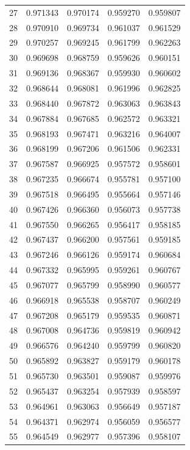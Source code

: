 \begin{table}
\begin{tabular}{rrrrr}
27 & 0.971343 & 0.970174 & 0.959270 & 0.959807 \\
28 & 0.970910 & 0.969734 & 0.961037 & 0.961529 \\
29 & 0.970257 & 0.969245 & 0.961799 & 0.962263 \\
30 & 0.969698 & 0.968759 & 0.959626 & 0.960151 \\
31 & 0.969136 & 0.968367 & 0.959930 & 0.960602 \\
32 & 0.968644 & 0.968081 & 0.961996 & 0.962825 \\
33 & 0.968440 & 0.967872 & 0.963063 & 0.963843 \\
34 & 0.967884 & 0.967685 & 0.962572 & 0.963321 \\
35 & 0.968193 & 0.967471 & 0.963216 & 0.964007 \\
36 & 0.968199 & 0.967206 & 0.961506 & 0.962331 \\
37 & 0.967587 & 0.966925 & 0.957572 & 0.958601 \\
38 & 0.967235 & 0.966674 & 0.955781 & 0.957100 \\
39 & 0.967518 & 0.966495 & 0.955664 & 0.957146 \\
40 & 0.967426 & 0.966360 & 0.956073 & 0.957738 \\
41 & 0.967550 & 0.966265 & 0.956417 & 0.958185 \\
42 & 0.967437 & 0.966200 & 0.957561 & 0.959185 \\
43 & 0.967246 & 0.966126 & 0.959174 & 0.960684 \\
44 & 0.967332 & 0.965995 & 0.959261 & 0.960767 \\
45 & 0.967077 & 0.965799 & 0.958990 & 0.960577 \\
46 & 0.966918 & 0.965538 & 0.958707 & 0.960249 \\
47 & 0.967208 & 0.965179 & 0.959535 & 0.960871 \\
48 & 0.967008 & 0.964736 & 0.959819 & 0.960942 \\
49 & 0.966576 & 0.964240 & 0.959799 & 0.960820 \\
50 & 0.965892 & 0.963827 & 0.959179 & 0.960178 \\
51 & 0.965730 & 0.963501 & 0.959087 & 0.959976 \\
52 & 0.965437 & 0.963254 & 0.957939 & 0.958597 \\
53 & 0.964961 & 0.963063 & 0.956649 & 0.957187 \\
54 & 0.964371 & 0.962974 & 0.956059 & 0.956577 \\
55 & 0.964549 & 0.962977 & 0.957396 & 0.958107 \\

\end{tabular}
\end{table}
